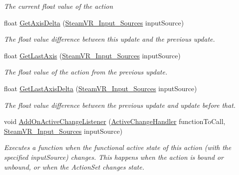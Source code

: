 \begin{DoxyCompactItemize}
\begin{DoxyCompactList}\small\item\em The current float value of the action \end{DoxyCompactList}\item 
float \mbox{\hyperlink{class_valve_1_1_v_r_1_1_steam_v_r___action___single_a8aa6e18ddcc56f8eb53277dbf91a731a}{Get\+Axis\+Delta}} (\mbox{\hyperlink{namespace_valve_1_1_v_r_a82e5bf501cc3aa155444ee3f0662853f}{Steam\+V\+R\+\_\+\+Input\+\_\+\+Sources}} input\+Source)
\begin{DoxyCompactList}\small\item\em The float value difference between this update and the previous update. \end{DoxyCompactList}\item 
float \mbox{\hyperlink{class_valve_1_1_v_r_1_1_steam_v_r___action___single_a6c9ab66919b07bc3bdf1012b9c1a05c1}{Get\+Last\+Axis}} (\mbox{\hyperlink{namespace_valve_1_1_v_r_a82e5bf501cc3aa155444ee3f0662853f}{Steam\+V\+R\+\_\+\+Input\+\_\+\+Sources}} input\+Source)
\begin{DoxyCompactList}\small\item\em The float value of the action from the previous update. \end{DoxyCompactList}\item 
float \mbox{\hyperlink{class_valve_1_1_v_r_1_1_steam_v_r___action___single_a8732072fe03f7645b4087d20dce8df39}{Get\+Last\+Axis\+Delta}} (\mbox{\hyperlink{namespace_valve_1_1_v_r_a82e5bf501cc3aa155444ee3f0662853f}{Steam\+V\+R\+\_\+\+Input\+\_\+\+Sources}} input\+Source)
\begin{DoxyCompactList}\small\item\em The float value difference between the previous update and update before that. \end{DoxyCompactList}\item 
void \mbox{\hyperlink{class_valve_1_1_v_r_1_1_steam_v_r___action___single_a7c280e8752917180b21bbf4d953d4243}{Add\+On\+Active\+Change\+Listener}} (\mbox{\hyperlink{class_valve_1_1_v_r_1_1_steam_v_r___action___single_a45ad70dbb8a58191f373b7ae098b833b}{Active\+Change\+Handler}} function\+To\+Call, \mbox{\hyperlink{namespace_valve_1_1_v_r_a82e5bf501cc3aa155444ee3f0662853f}{Steam\+V\+R\+\_\+\+Input\+\_\+\+Sources}} input\+Source)
\begin{DoxyCompactList}\small\item\em Executes a function when the {\itshape functional} active state of this action (with the specified input\+Source) changes. This happens when the action is bound or unbound, or when the Action\+Set changes state. \end{DoxyCompactList}\item 

\end{DoxyCompactItemize}
